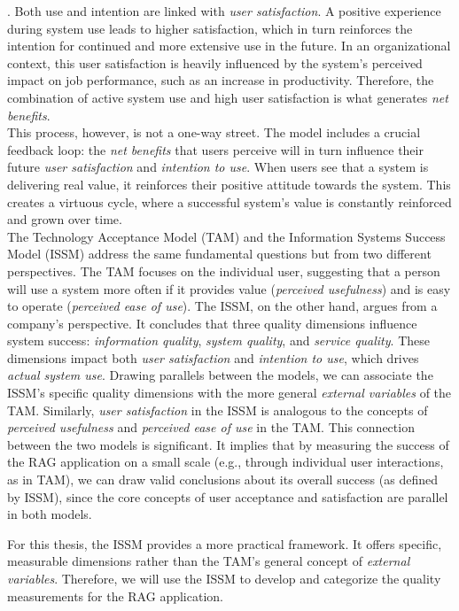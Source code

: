 \documentclass[
	english,
	ruledheaders=section,%
	class=report,%
	thesis={type=bachelor},%
	accentcolor=1b,%
	custommargins=true,%
	marginpar=false,%
	parskip=half-,%
	fontsize=11pt,%
	DIV=14,
]{tudapub}
\begin{document}
\parencite{DeloneMcLean2003ISSuccessTenYearUpdate}. Both use and intention are linked with \textit{user satisfaction}. A positive experience during system use leads to higher satisfaction, which in turn reinforces the intention for continued and more extensive use in the future. In an organizational context, this user satisfaction is heavily influenced by the system's perceived impact on job performance, such as an increase in productivity. Therefore, the combination of active system use and high user satisfaction is what generates \textit{net benefits}.\\
This process, however, is not a one-way street. The model includes a crucial feedback loop: the \textit{net benefits} that users perceive will in turn influence their future \textit{user satisfaction} and \textit{intention to use}. When users see that a system is delivering real value, it reinforces their positive attitude towards the system. This creates a virtuous cycle, where a successful system's value is constantly reinforced and grown over time.\\

The Technology Acceptance Model (TAM) and the Information Systems Success Model (ISSM) address the same fundamental questions but from two different perspectives. The TAM focuses on the individual user, suggesting that a person will use a system more often if it provides value (\textit{perceived usefulness}) and is easy to operate (\textit{perceived ease of use}).
The ISSM, on the other hand, argues from a company's perspective. It concludes that three quality dimensions influence system success: \textit{information quality}, \textit{system quality}, and \textit{service quality}. These dimensions impact both \textit{user satisfaction} and \textit{ intention to use}, which drives \textit{actual system use}.
Drawing parallels between the models, we can associate the ISSM's specific quality dimensions with the more general \textit{external variables} of the TAM. Similarly, \textit{user satisfaction} in the ISSM is analogous to the concepts of \textit{perceived usefulness} and \textit{perceived ease of use} in the TAM. This connection between the two models is significant. It implies that by measuring the success of the RAG application on a small scale (e.g., through individual user interactions, as in TAM), we can draw valid conclusions about its overall success (as defined by ISSM), since the core concepts of user acceptance and satisfaction are parallel in both models.

For this thesis, the ISSM provides a more practical framework. It offers specific, measurable dimensions rather than the TAM's general concept of \textit{external variables}. Therefore, we will use the ISSM to develop and categorize the quality measurements for the RAG application.
\end{document}
